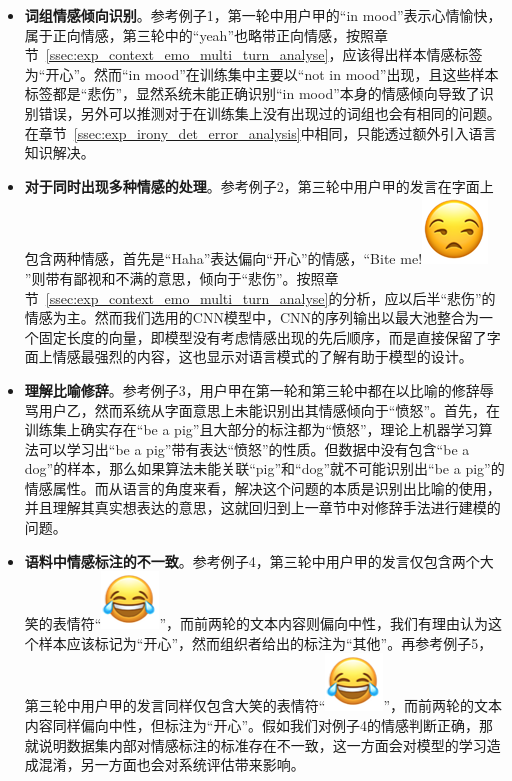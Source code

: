\begin{itemize}

\item {\bf 词组情感倾向识别}。参考例子1，第一轮中用户甲的“in mood”表示心情愉快，属于正向情感，第三轮中的“yeah”也略带正向情感，按照章节~\ref{ssec:exp_context_emo_multi_turn_analyse}，应该得出样本情感标签为“开心”。然而“in mood”在训练集中主要以“not in mood”出现，且这些样本标签都是“悲伤”，显然系统未能正确识别“in mood”本身的情感倾向导致了识别错误，另外可以推测对于在训练集上没有出现过的词组也会有相同的问题。在章节~\ref{ssec:exp_irony_det_error_analysis}中相同，只能透过额外引入语言知识解决。

\item {\bf 对于同时出现多种情感的处理}。参考例子2，第三轮中用户甲的发言在字面上包含两种情感，首先是“Haha”表达偏向“开心”的情感，“Bite me!\includegraphics[height=1.5\fontcharht\font`\B]{img/emoji/speechless.png}”则带有鄙视和不满的意思，倾向于“悲伤”。按照章节~\ref{ssec:exp_context_emo_multi_turn_analyse}的分析，应以后半“悲伤”的情感为主。然而我们选用的CNN模型中，CNN的序列输出以最大池整合为一个固定长度的向量，即模型没有考虑情感出现的先后顺序，而是直接保留了字面上情感最强烈的内容，这也显示对语言模式的了解有助于模型的设计。

\item {\bf 理解比喻修辞}。参考例子3，用户甲在第一轮和第三轮中都在以比喻的修辞辱骂用户乙，然而系统从字面意思上未能识别出其情感倾向于“愤怒”。首先，在训练集上确实存在“be a pig”且大部分的标注都为“愤怒”，理论上机器学习算法可以学习出“be a pig”带有表达“愤怒”的性质。但数据中没有包含“be a dog”的样本，那么如果算法未能关联“pig”和“dog”就不可能识别出“be a pig”的情感属性。而从语言的角度来看，解决这个问题的本质是识别出比喻的使用，并且理解其真实想表达的意思，这就回归到上一章节中对修辞手法进行建模的问题。

\item {\bf 语料中情感标注的不一致}。参考例子4，第三轮中用户甲的发言仅包含两个大笑的表情符“\includegraphics[height=1.5\fontcharht\font`\B]{img/emoji/lol.png}”，而前两轮的文本内容则偏向中性，我们有理由认为这个样本应该标记为“开心”，然而组织者给出的标注为“其他”。再参考例子5，第三轮中用户甲的发言同样仅包含大笑的表情符“\includegraphics[height=1.5\fontcharht\font`\B]{img/emoji/lol.png}”，而前两轮的文本内容同样偏向中性，但标注为“开心”。假如我们对例子4的情感判断正确，那就说明数据集内部对情感标注的标准存在不一致，这一方面会对模型的学习造成混淆，另一方面也会对系统评估带来影响。

\end{itemize}

